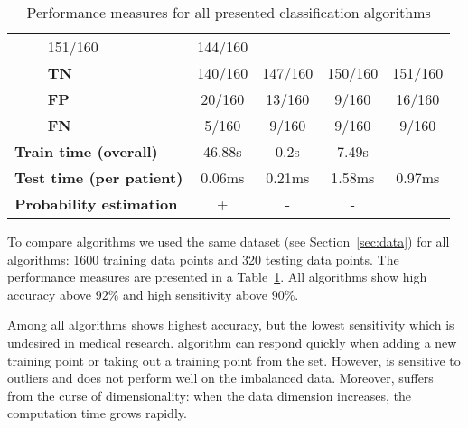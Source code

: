 \begin{table}[]
\begin{center}
\begin{tabular}{|l|l|c|c|c|c|}
		                    &    
		                    151/160                               
		&                144/160                    \\ \cline{2-6} 
		& \textbf{TN} &     140/160                        
		&     147/160                                        
		&               
		      150/160              &    
		      151/160                                \\ 
		\cline{2-6} 
		& \textbf{FP} & 20/160                             
		&   13/160                                          
		&               
		    9/160                &          
		    16/160                          \\ 
		\cline{2-6} 
		& \textbf{FN} & 5/160                            
		&  9/160                                           
		&               
		   9/160                 &                  
		   9/160                  \\ 
		\hline
		\multicolumn{2}{|l|}{\textbf{Train time (overall)}} 
		&46.88s &0.2s &7.49s&-\\
		\hline
		\multicolumn{2}{|l|}{\textbf{Test time (per 
		patient)}}                                    &               
		       0.06ms             
		&       0.21ms                                      
		&               
		   1.58ms                 &               
		   0.97ms                     \\ 
		\hline
		\multicolumn{2}{|l|}{\textbf{Probability 
		estimation}}                                     & 
		+                                 &        -                   
		                  &  -                                
		&                                    \\ \hline
	\end{tabular}
\end{center}
\caption{Performance measures for all presented classification 
algorithms}
\label{tbl:res}
\end{table}


To compare algorithms we used the same dataset 
(see Section~\ref{sec:data}) for all algorithms: 1600 
training data points and 320 testing data points.
The performance measures are presented in a 
Table~\ref{tbl:res}.
All algorithms show high accuracy above $92\%$ and high sensitivity 
above $90\%$. 

Among all algorithms \knn{} shows highest accuracy, but the lowest 
sensitivity which is undesired in medical research. 
\knn{} algorithm can respond quickly when adding a new training 
point or taking out a training point from the set. However, \knn{} is 
sensitive to outliers and does not perform well on the imbalanced 
data. 
Moreover, \knn{} suffers from the curse of dimensionality: when the 
data dimension increases, the computation time grows rapidly. 

